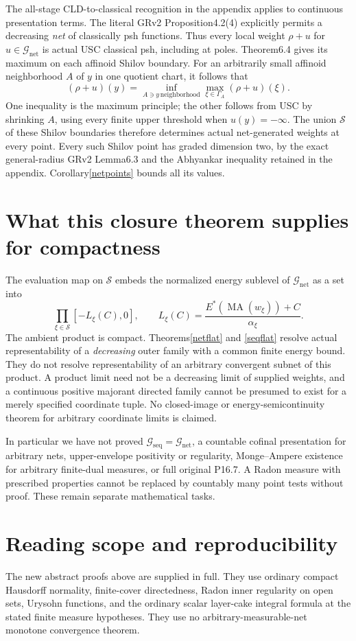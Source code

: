 \documentclass[11pt]{article}
\newcommand{\MA}{\operatorname{MA}}
\newcommand{\GN}{\mathcal G_{\mathrm{net}}}
\newcommand{\GS}{\mathcal G_{\mathrm{seq}}}
\theoremstyle{remark}\newtheorem{remark}[theorem]{Remark}
\begin{document}
The all-stage CLD-to-classical recognition in the appendix applies
to continuous presentation terms. The literal GRv2
Proposition4.2(4) explicitly permits a decreasing \emph{net} of
classically psh functions. Thus every local weight $\rho+u$ for
$u\in\GN$ is actual USC classical psh, including at poles.
Theorem6.4 gives its maximum on each affinoid Shilov boundary.
For an arbitrarily small affinoid neighborhood $A$ of $y$ in
one quotient chart, it follows that
\[
 (\rho+u)(y)=\inf_{A\ni y\,\mathrm{neighborhood}}
 \max_{\xi\in\Gamma_A}(\rho+u)(\xi).
\]
One inequality is the maximum principle; the other follows from
USC by shrinking $A$, using every finite upper threshold when
$u(y)=-\infty$. The union $\mathscr S$ of these Shilov boundaries
therefore determines actual net-generated weights at every point.
Every such Shilov point has graded dimension two, by the exact
general-radius GRv2 Lemma6.3 and the Abhyankar inequality retained
in the appendix. Corollary\ref{netpoints} bounds all its values.

\section{What this closure theorem supplies for compactness}
The evaluation map on $\mathscr S$ embeds the normalized
energy sublevel of $\GN$ as a set into
\[
 \prod_{\xi\in\mathscr S}[-L_\xi(C),0],\qquad
 L_\xi(C)=\frac{E^*(\MA(w_\xi))+C}{\alpha_\xi}.
\]
The ambient product is compact. Theorems\ref{netflat} and
\ref{seqflat} resolve actual representability of a
\emph{decreasing} outer family with a common finite energy bound.
They do not resolve representability of an arbitrary convergent
subnet of this product. A product limit need not be a decreasing
limit of supplied weights, and a continuous positive majorant
directed family cannot be presumed to exist for a merely specified
coordinate tuple. No closed-image or energy-semicontinuity theorem
for arbitrary coordinate limits is claimed.

In particular we have not proved $\GS=\GN$, a countable cofinal
presentation for arbitrary nets, upper-envelope positivity or
regularity, Monge--Ampere existence for arbitrary finite-dual
measures, or full original P16.7. A Radon measure with prescribed
properties cannot be replaced by countably many point tests without
proof. These remain separate mathematical tasks.

\section{Reading scope and reproducibility}
The new abstract proofs above are supplied in full. They use
ordinary compact Hausdorff normality, finite-cover directedness,
Radon inner regularity on open sets, Urysohn functions, and the
ordinary scalar layer-cake integral formula at the stated finite
measure hypotheses. They use no arbitrary-measurable-net monotone
convergence theorem.
\end{document}
